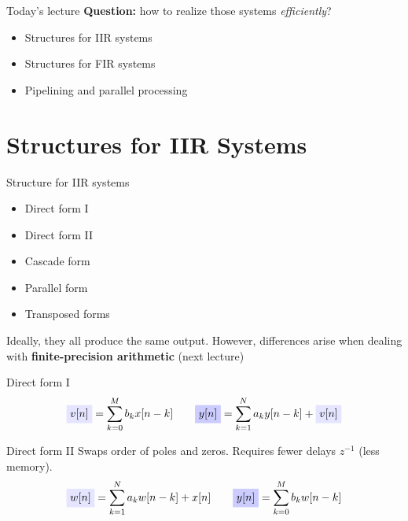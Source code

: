 \documentclass[10pt, aspectratio=169, handout]{beamer}
\begin{document}
%
\begin{frame}{Today's lecture}
	\textbf{Question:} how to realize those systems \textit{efficiently}?
	
	\begin{itemize}
		\item Structures for IIR systems
		\item Structures for FIR systems
		\item Pipelining and parallel processing
	\end{itemize}
\end{frame}

%
\section{Structures for IIR Systems}
\begin{frame}{Structure for IIR systems}
	\begin{itemize}
		\item Direct form I
		\item Direct form II
		\item Cascade form
		\item Parallel form
		\item Transposed forms
	\end{itemize}

	Ideally, they all produce the same output. However, differences arise when dealing with \textbf{finite-precision arithmetic} (next lecture)
\end{frame}


\begin{frame}{Direct form I}
	\begin{equation*}
	\tikz[baseline]{\node[fill=blue!10,anchor=base] {$v[n]$};} = \sum_{k = 0}^{M}b_kx[n-k] \qquad \tikz[baseline]{\node[fill=blue!20,anchor=base] {$y[n]$};} = \sum_{k = 1}^{N}a_ky[n-k] + \tikz[baseline]{\node[fill=blue!10,anchor=base] {$v[n]$};}
	\end{equation*}
\begin{center}
		\resizebox{0.45\textwidth}{!}{}
\end{center}
\end{frame}

\begin{frame}{Direct form II}
	Swaps order of poles and zeros. Requires fewer delays $z^{-1}$ (less memory).
	\begin{equation*}
	\tikz[baseline]{\node[fill=blue!10,anchor=base] {$w[n]$};} = \sum_{k = 1}^{N}a_kw[n-k] + x[n] \qquad \tikz[baseline]{\node[fill=blue!20,anchor=base] {$y[n]$};} = \sum_{k = 0}^{M}b_kw[n-k]
	\end{equation*}
	\begin{center}
		\resizebox{0.35\textwidth}{!}{}
	\end{center}
\end{frame}
\end{document}
